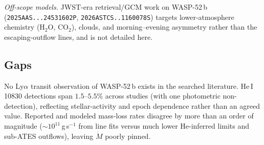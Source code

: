 \medskip
{\sloppy
\noindent\emph{Off-scope models.} JWST-era retrieval/GCM work on WASP-52\,b
(\texttt{2025AAS...24531602P}, \texttt{2026ASTCS..1160078S}) targets lower-atmosphere
chemistry (H$_2$O, CO$_2$), clouds, and morning--evening asymmetry rather than the
escaping-outflow lines, and is not detailed here.\par}

\subsection{Gaps}
No Ly$\alpha$ transit observation of WASP-52\,b exists in the searched literature.
He\,I 10830 detections span $1.5$--$5.5\%$ across studies (with one photometric
non-detection), reflecting stellar-activity and epoch dependence rather than an agreed
value. Reported and modeled mass-loss rates disagree by more than an order of magnitude
($\sim10^{11}$\,g\,s$^{-1}$ from line fits versus much lower He-inferred limits and
sub-\textsc{ATES} outflows), leaving $\dot M$ poorly pinned.
